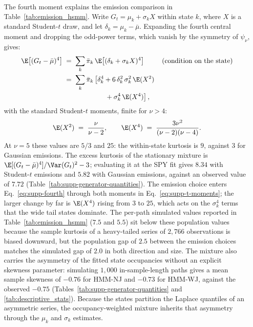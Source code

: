 The fourth moment explains the emission comparison in
Table~\ref{tab:emission_hsmm}. Write $G_t = \mu_k +
\sigma_k X$ within state $k$, where $X$ is a standard Student-$t$
draw, and let $\delta_k = \mu_k - \bar\mu$. Expanding the fourth
central moment and dropping the odd-power terms, which vanish by the
symmetry of $\psi_\nu$, gives:
\begin{align}
  \E\big[(G_t - \bar\mu)^4\big]
   &\;=\; \sum_k \bar\pi_k\,
     \E\big[(\delta_k + \sigma_k X)^4\big]
     && \text{(condition on the state)} \notag \\
   &\;=\; \sum_k \bar\pi_k \left[
     \delta_k^4
     + 6\, \delta_k^2\, \sigma_k^2\, \E(X^2)\right. \notag \\
   &\hspace{6em}\left.{}
     + \sigma_k^4\, \E(X^4)
     \right],
  \label{eq:supp-fourth}
\end{align}
with the standard Student-$t$ moments, finite for $\nu > 4$:
\begin{equation}
  \E(X^2) \;=\; \frac{\nu}{\nu - 2},
  \qquad
  \E(X^4) \;=\; \frac{3 \nu^2}{(\nu - 2)(\nu - 4)}.
  \label{eq:supp-t-moments}
\end{equation}
At $\nu = 5$ these values are $5/3$ and $25$: the within-state
kurtosis is $9$, against $3$ for Gaussian emissions. The excess kurtosis of the stationary mixture is
$\E[(G_t - \bar\mu)^4] / \Var(G_t)^2 - 3$; evaluating it at the SPY
fit gives $8.34$ with Student-$t$ emissions and $5.82$ with Gaussian
emissions, against an observed value of $7.72$
(Table~\ref{tab:supp-generator-quantities}). The emission choice enters
Eq.~\eqref{eq:supp-fourth} through both moments in
Eq.~\eqref{eq:supp-t-moments}; the larger change by far is
$\E(X^4)$ rising from $3$ to $25$, which acts on the $\sigma_k^4$
terms that the wide tail states dominate. The per-path simulated values reported in
Table~\ref{tab:emission_hsmm} ($7.5$ and $5.5$) sit
below these population values because the sample kurtosis of a
heavy-tailed series of $2{,}766$ observations is biased downward, but
the population gap of $2.5$ between the emission choices matches the
simulated gap of $2.0$ in both direction and size. The mixture also
carries the asymmetry of the fitted state occupancies without an
explicit skewness parameter: simulating $1{,}000$ in-sample-length
paths gives a mean sample skewness of $-0.76$ for HMM-NJ and $-0.73$
for HMM-WJ, against the observed $-0.75$
(Tables~\ref{tab:supp-generator-quantities}
and \ref{tab:descriptive_stats}). Because the states partition the
Laplace quantiles of an asymmetric series, the occupancy-weighted
mixture inherits that asymmetry through the $\mu_k$ and $\sigma_k$
estimates.

